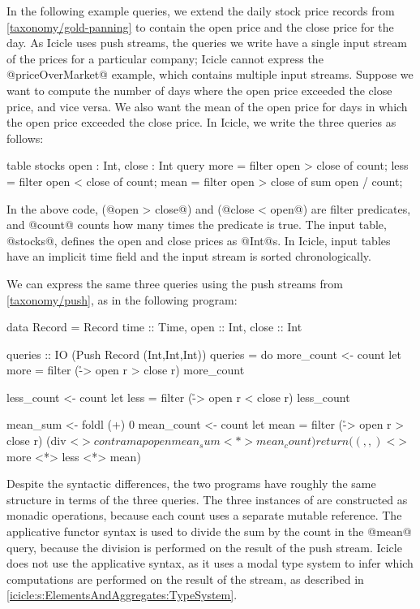 In the following example queries, we extend the daily stock price records from \cref{taxonomy/gold-panning} to contain the open price and the close price for the day.
As Icicle uses push streams, the queries we write have a single input stream of the prices for a particular company; Icicle cannot express the @priceOverMarket@ example, which contains multiple input streams.
Suppose we want to compute the number of days where the open price exceeded the close price, and vice versa.
We also want the mean of the open price for days in which the open price exceeded the close price.
In Icicle, we write the three queries as follows:

\begin{icicle}
table stocks { open : Int, close : Int }
query 
  more = filter open > close of count;
  less = filter open < close of count;
  mean = filter open > close of sum open / count;
\end{icicle}

In the above code, (@open > close@) and (@close < open@) are filter predicates, and @count@ counts how many times the predicate is true.
The input table, @stocks@, defines the open and close prices as @Int@s.
In Icicle, input tables have an implicit time field and the input stream is sorted chronologically.

We can express the same three queries using the push streams from \cref{taxonomy/push}, as in the following program:

\begin{haskell}
data Record = Record
 { time :: Time, open :: Int, close :: Int }

queries :: IO (Push Record (Int,Int,Int))
queries = do
  more_count <- count
  let more = filter (\r -> open r > close r) more_count

  less_count <- count
  let less = filter (\r -> open r < close r) less_count

  mean_sum   <- foldl (+) 0
  mean_count <- count
  let mean = filter (\r -> open r > close r)
                    (div <$> contramap open mean_sum <*> mean_count)
  return ((,,) <$> more <*> less <*> mean)
\end{haskell}

Despite the syntactic differences, the two programs have roughly the same structure in terms of the three queries.
The three instances of \Hs@count@ are constructed as monadic \Hs@IO@ operations, because each count uses a separate mutable reference.
The applicative functor syntax is used to divide the sum by the count in the @mean@ query, because the division is performed on the result of the push stream.
Icicle does not use the applicative syntax, as it uses a modal type system to infer which computations are performed on the result of the stream, as described in \cref{icicle:s:ElementsAndAggregates:TypeSystem}.

